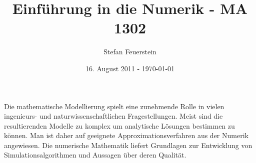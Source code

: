 \documentclass[10pt,a4paper]{article}
\author{Stefan Feuerstein}
\title {Einführung in die Numerik - MA 1302}
\date  {16. August 2011 - \today}
\theoremstyle{definition} \newtheorem{definition}{Definition}[section]
\theoremstyle{remark}     \newtheorem*{bemerkung}{\textbf{Bemerkung}} %
\begin{document}
\maketitle

Die mathematische Modellierung spielt eine zunehmende Rolle in vielen
ingenieurs- und naturwissenschaftlichen Fragestellungen.  Meist sind die
resultierenden Modelle zu komplex um analytische Lösungen bestimmen zu können.
Man ist daher auf geeignete Approximationsverfahren aus der Numerik angewiesen.
Die numerische Mathematik liefert Grundlagen zur Entwicklung von
Simulationsalgorithmen und Aussagen über deren Qualität.




\pagebreak
\listofalgorithms
\end{document}
